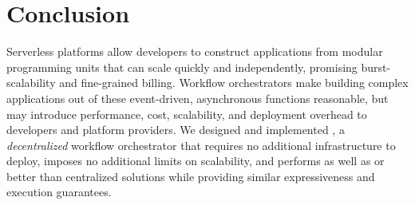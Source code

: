 %

\section{Conclusion}\label{sec:conclusion}

Serverless platforms allow developers to construct applications from modular
programming units that can scale quickly and independently, promising
burst-scalability and fine-grained billing. Workflow orchestrators make building
complex applications out of these event-driven, asynchronous functions
reasonable, but may introduce performance, cost, scalability, and deployment
overhead to developers and platform providers. We designed and implemented
\name{}, a \emph{decentralized} workflow orchestrator that requires no
additional infrastructure to deploy, imposes no additional limits on
scalability, and performs as well as or better than centralized solutions while
providing similar expressiveness and execution guarantees.
